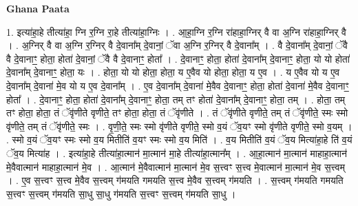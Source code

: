 \documentclass[17pt]{extarticle}
\begin{document}
\textbf{Ghana Paata } \newline

1. इत्या॑हा॒हे तीत्या॑हा॒ ग्नि र॒ग्नि रा॒हे तीत्या॑हा॒ग्निः । . आ॒हा॒ग्नि र॒ग्नि रा॑हाहा॒ग्निर् वै वा अ॒ग्नि रा॑हाहा॒ग्निर् वै । . अ॒ग्निर् वै वा अ॒ग्नि र॒ग्निर् वै दे॒वाना᳚म् दे॒वानां॒ ॅवा अ॒ग्नि र॒ग्निर् वै दे॒वाना᳚म् । . वै दे॒वाना᳚म् दे॒वानां॒ ॅवै वै दे॒वानाꣳ॒॒ होता॒ होता॑ दे॒वानां॒ ॅवै वै दे॒वानाꣳ॒॒ होता᳚ । . दे॒वानाꣳ॒॒ होता॒ होता॑ दे॒वाना᳚म् दे॒वानाꣳ॒॒ होता॒ यो यो होता॑ दे॒वाना᳚म् दे॒वानाꣳ॒॒ होता॒ यः । . होता॒ यो यो होता॒ होता॒ य ए॒वैव यो होता॒ होता॒ य ए॒व । . य ए॒वैव यो य ए॒व दे॒वाना᳚म् दे॒वाना॑ मे॒व यो य ए॒व दे॒वाना᳚म् । . ए॒व दे॒वाना᳚म् दे॒वाना॑ मे॒वैव दे॒वानाꣳ॒॒ होता॒ होता॑ दे॒वाना॑ मे॒वैव दे॒वानाꣳ॒॒ होता᳚ । . दे॒वानाꣳ॒॒ होता॒ होता॑ दे॒वाना᳚म् दे॒वानाꣳ॒॒ होता॒ तम् तꣳ होता॑ दे॒वाना᳚म् दे॒वानाꣳ॒॒ होता॒ तम् । . होता॒ तम् तꣳ होता॒ होता॒ तं ॅवृ॑णीते वृणीते॒ तꣳ होता॒ होता॒ तं ॅवृ॑णीते । . तं ॅवृ॑णीते वृणीते॒ तम् तं ॅवृ॑णीते॒ स्मः स्मो वृ॑णीते॒ तम् तं ॅवृ॑णीते॒ स्मः । . वृ॒णी॒ते॒ स्मः स्मो वृ॑णीते वृणीते॒ स्मो व॒यं ॅव॒यꣳ स्मो वृ॑णीते वृणीते॒ स्मो व॒यम् । . स्मो व॒यं ॅव॒यꣳ स्मः स्मो व॒य मितीति॑ व॒यꣳ स्मः स्मो व॒य मिति॑ । . व॒य मितीति॑ व॒यं ॅव॒य मित्या॑हा॒हे ति॑ व॒यं ॅव॒य मित्या॑ह । . इत्या॑हा॒हे तीत्या॑हा॒त्मान॑ मा॒त्मान॑ मा॒हे तीत्या॑हा॒त्मान᳚म् । . आ॒हा॒त्मान॑ मा॒त्मान॑ माहाहा॒त्मान॑ मे॒वैवात्मान॑ माहाहा॒त्मान॑ मे॒व । . आ॒त्मान॑ मे॒वैवात्मान॑ मा॒त्मान॑ मे॒व स॒त्त्वꣳ स॒त्त्व मे॒वात्मान॑ मा॒त्मान॑ मे॒व स॒त्त्वम् । . ए॒व स॒त्त्वꣳ स॒त्त्व मे॒वैव स॒त्त्वम् ग॑मयति गमयति स॒त्त्व मे॒वैव स॒त्त्वम् ग॑मयति । . स॒त्त्वम् ग॑मयति गमयति स॒त्त्वꣳ स॒त्त्वम् ग॑मयति सा॒धु सा॒धु ग॑मयति स॒त्त्वꣳ स॒त्त्वम् ग॑मयति सा॒धु । \newline
\end{document}
